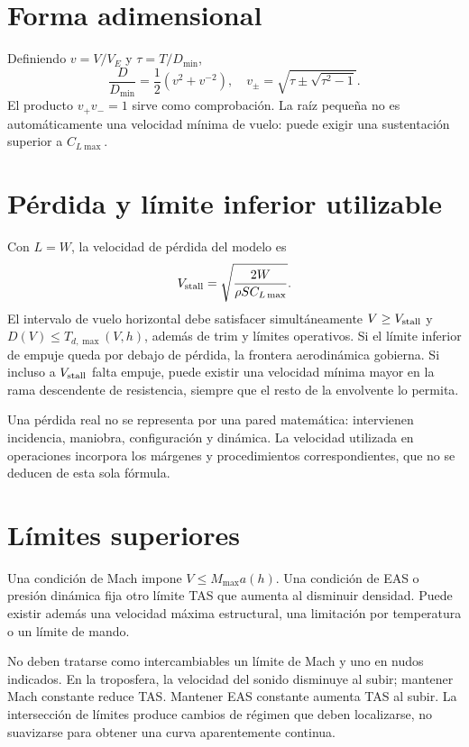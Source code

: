 \section{Forma adimensional}
Definiendo $v=V/V_E$ y $\tau=T/D_{\min}$,
\begin{equation}
\frac{D}{D_{\min}}=\frac12(v^2+v^{-2}),\quad
v_\pm=\sqrt{\tau\pm\sqrt{\tau^2-1}}.
\end{equation}
El producto $v_+v_-=1$ sirve como comprobación. La raíz pequeña no es automáticamente una velocidad mínima de vuelo: puede exigir una sustentación superior a $C_{L\max}$.

\section{Pérdida y límite inferior utilizable}
Con $L=W$, la velocidad de pérdida del modelo es
\begin{equation}
V_{\rm stall}=\sqrt{\frac{2W}{\rho SC_{L\max}}}.
\end{equation}
El intervalo de vuelo horizontal debe satisfacer simultáneamente $V\geq V_{\rm stall}$ y $D(V)\leq T_{d,\max}(V,h)$, además de trim y límites operativos. Si el límite inferior de empuje queda por debajo de pérdida, la frontera aerodinámica gobierna. Si incluso a $V_{\rm stall}$ falta empuje, puede existir una velocidad mínima mayor en la rama descendente de resistencia, siempre que el resto de la envolvente lo permita.

Una pérdida real no se representa por una pared matemática: intervienen incidencia, maniobra, configuración y dinámica. La velocidad utilizada en operaciones incorpora los márgenes y procedimientos correspondientes, que no se deducen de esta sola fórmula.

\section{Límites superiores}
Una condición de Mach impone $V\leq M_{\max}a(h)$. Una condición de EAS o presión dinámica fija otro límite TAS que aumenta al disminuir densidad. Puede existir además una velocidad máxima estructural, una limitación por temperatura o un límite de mando.

No deben tratarse como intercambiables un límite de Mach y uno en nudos indicados. En la troposfera, la velocidad del sonido disminuye al subir; mantener Mach constante reduce TAS. Mantener EAS constante aumenta TAS al subir. La intersección de límites produce cambios de régimen que deben localizarse, no suavizarse para obtener una curva aparentemente continua.

